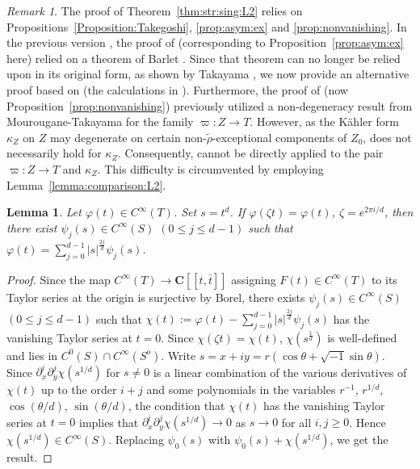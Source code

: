 \documentclass[amscd, leqno]{amsart}
\theoremstyle{plain}
\newtheorem{lemma}[theorem]{Lemma}
\theoremstyle{definition}
\theoremstyle{remark}
\newtheorem{remark}[theorem]{Remark}
\newenvironment{pf}{\begin{proof}}{\end{proof}}
\begin{document}
\begin{remark}
\label{remark:inaccuracy}
The proof of Theorem~\ref{thm:str:sing:L2} relies on Propositions~\ref{Proposition:Takegoshi}, \ref{prop:asym:ex} 
and \ref{prop:nonvanishing}.
In the previous version \cite{Yoshikawa10a}, the proof of \cite[Lemma~6.3]{Yoshikawa10a}
(corresponding to Proposition~\ref{prop:asym:ex} here) relied on a theorem of Barlet \cite[Th.\,4 bis]{Barlet82}. 
Since that theorem can no longer be relied upon in its original form, as shown by Takayama \cite[Th.\,7.1.3, Remark\,7.1.4]{Takayama21},
we now provide an alternative proof based on \cite[Prop.\,6.1]{Takayama22} (the calculations in \cite[p.140 Cas 1]{Barlet82}).
Furthermore, the proof of \cite[Lemma~6.4]{Yoshikawa10a} (now Proposition~\ref{prop:nonvanishing}) previously utilized 
a non-degeneracy result from Mourougane-Takayama \cite[Lemma 4.8]{MourouganeTakayama09} for the family $\varpi \colon Z \to T$. 
However, as the K\"ahler form $\kappa_{Z}$ on $Z$ may degenerate on certain non-$\widetilde{\rho}$-exceptional components of $Z_{0}$, 
\cite[Lemma\,4.1]{MourouganeTakayama09} does not necessarily hold for $\kappa_{Z}$. 
Consequently, \cite[Lemma 4.8]{MourouganeTakayama09} cannot be directly applied to the pair $\varpi \colon Z \to T$ and $\kappa_{Z}$. 
This difficulty is circumvented by employing Lemma~\ref{lemma:comparison:L2}.
\end{remark}


\begin{lemma}
\label{lemma:Taylor:ram:cov}
Let $\varphi(t) \in C^{\infty}(T)$. Set $s = t^{d}$. If $\varphi(\zeta t) = \varphi(t)$, $\zeta=e^{2\pi i/d}$,
then there exist $\psi_{j}(s) \in C^{\infty}(S)$ $(0\leq j \leq d-1)$ such that $\varphi(t) = \sum_{j=0}^{d-1} |s|^{\frac{2j}{d}} \psi_{j}(s)$.
\end{lemma}

\begin{pf}
Since the map $C^{\infty}(T) \to {\mathbf C}[[ t, \bar{t} ]]$ assigning $F(t) \in C^{\infty}(T)$ to its Taylor series at the origin is surjective
by Borel,
there exists $\psi_{j}(s) \in C^{\infty}(S)$ $(0\leq j \leq d-1)$ such that $\chi(t) := \varphi(t) - \sum_{j=0}^{d-1} |s|^{\frac{2j}{d}} \psi_{j}(s)$
has the vanishing Taylor series at $t=0$. Since $\chi(\zeta t ) = \chi(t)$, $\chi(s^{\frac{1}{d}})$ is well-defined and lies in 
$C^{0}(S) \cap C^{\infty}(S^{o})$. Write $s=x+iy=r(\cos\theta + \sqrt{-1} \sin\theta)$. 
Since $\partial_{x}^{i}\partial_{y}^{j} \chi(s^{1/d})$ for $s\not=0$ is a linear combination of the various derivatives of $\chi(t)$ 
up to the order $i+j$ and some polynomials in the variables $r^{-1}$, $r^{1/d}$, $\cos(\theta/d)$, $\sin(\theta/d)$, 
the condition that $\chi(t)$ has the vanishing Taylor series at $t=0$ implies that
$\partial_{x}^{i}\partial_{y}^{j} \chi(s^{1/d}) \to 0$ as $s \to 0$ for all $i,j \geq0$. Hence $\chi(s^{1/d}) \in C^{\infty}(S)$.
Replacing $\psi_{0}(s)$ with $\psi_{0}(s)+\chi(s^{1/d})$, we get the result.
\end{pf}
\end{document}
